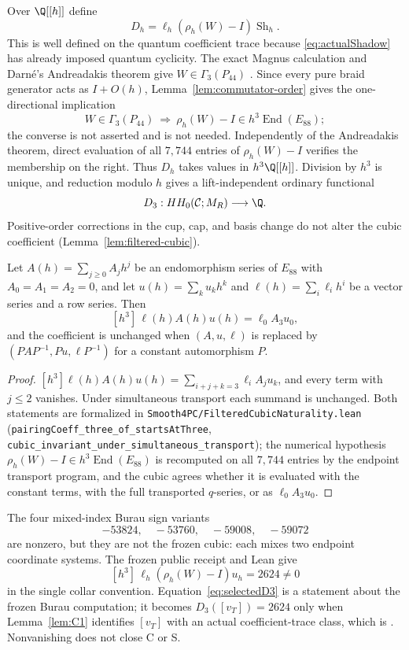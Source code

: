 Over $\Q[[h]]$ define
\[
D_h=\ell_h(\rho_h(W)-I)\operatorname{Sh}_h.
\]
This is well defined on the quantum coefficient trace because
\eqref{eq:actualShadow} has already imposed quantum cyclicity.  The exact
Magnus calculation and Darn\'e's Andreadakis theorem give
$W\in\Gamma_3(P_{44})$ \cite[Theorem~6.2]{Darne2021}.  Since every pure
braid generator acts as $I+O(h)$, Lemma~\ref{lem:commutator-order} gives the
one-directional implication
\[
W\in\Gamma_3(P_{44})\ \Longrightarrow\
\rho_h(W)-I\in h^3\operatorname{End}(E_{88});
\]
the converse is not asserted and is not needed.  Independently of the
Andreadakis theorem, direct evaluation of all $7{,}744$ entries of
$\rho_h(W)-I$ verifies the membership on the right.
Thus $D_h$ takes values in $h^3\Q[[h]]$.  Division by $h^3$ is unique, and
reduction modulo $h$ gives a lift-independent ordinary functional
\[
D_3:HH_0(\mathcal C;M_R)\longrightarrow\Q.
\]
Positive-order corrections in the cup, cap, and basis change do not alter
the cubic coefficient (Lemma~\ref{lem:filtered-cubic}).

\begin{lemma}\label{lem:filtered-cubic}
Let $A(h)=\sum_{j\ge0}A_jh^j$ be an endomorphism series of $E_{88}$ with
$A_0=A_1=A_2=0$, and let $u(h)=\sum_k u_kh^k$ and
$\ell(h)=\sum_i\ell_ih^i$ be a vector series and a row series.  Then
\[
[h^3]\,\ell(h)A(h)u(h)=\ell_0A_3u_0,
\]
and the coefficient is unchanged when $(A,u,\ell)$ is replaced by
$(PAP^{-1},Pu,\ell P^{-1})$ for a constant automorphism $P$.
\end{lemma}

\begin{proof}
$[h^3]\ell(h)A(h)u(h)=\sum_{i+j+k=3}\ell_iA_ju_k$, and every term with
$j\le2$ vanishes.  Under simultaneous transport each summand is unchanged.
Both statements are formalized in
\texttt{Smooth4PC/FilteredCubicNaturality.lean}
(\texttt{pairingCoeff\_three\_of\_startsAtThree},
\texttt{cubic\_invariant\_under\_simultaneous\_transport}); the numerical
hypothesis $\rho_h(W)-I\in h^3\operatorname{End}(E_{88})$ is recomputed on
all $7{,}744$ entries by the endpoint transport program, and the cubic
agrees whether it is evaluated with the constant terms, with the full
transported $q$-series, or as $\ell_0A_3u_0$.
\end{proof}

The four mixed-index Burau sign variants
\[
-53824,\quad -53760,\quad -59008,\quad -59072
\]
are nonzero, but they are not the frozen cubic: each mixes two endpoint
coordinate systems.  The frozen public receipt and Lean give
\begin{equation}\label{eq:selectedD3}
[h^3]\,\ell_h(\rho_h(W)-I)u_h=2624\ne0
\end{equation}
in the single collar convention.  Equation~\eqref{eq:selectedD3} is a
statement about the frozen Burau computation; it becomes
$D_3([v_T])=2624$ only when Lemma~\ref{lem:C1} identifies $[v_T]$ with an
actual coefficient-trace class, which is \Open.  Nonvanishing does not
close C or S.

